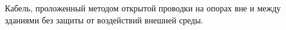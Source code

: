 Кабель, проложенный методом открытой проводки на опорах вне
и между зданиями без защиты от воздействий внешней среды.